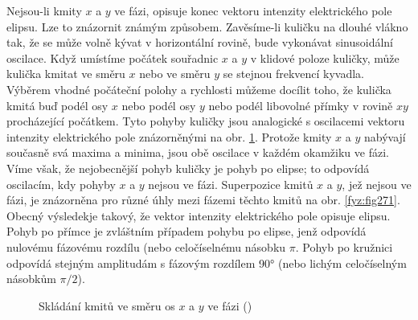     Nejsou-li kmity \(x\) a \(y\) ve fázi, opisuje konec vektoru intenzity elektrického pole elipsu.
    Lze to znázornit známým způsobem. Zavěsíme-li kuličku na dlouhé vlákno tak, že se může volně
    kývat v horizontální rovině, bude vykonávat sinusoidální oscilace. Když umístíme počátek
    souřadnic \(x\) a \(y\) v klidové poloze kuličky, může kulička kmitat ve směru \(x\) nebo ve
    směru \(y\) se stejnou frekvencí kyvadla. Výběrem vhodné počáteční polohy a rychlosti můžeme
    docílit toho, že kulička kmitá buď podél osy \(x\) nebo podél osy \(y\) nebo podél libovolné
    přímky v rovině \(xy\) procházející počátkem. Tyto pohyby kuličky jsou analogické s oscilacemi
    vektoru intenzity elektrického pole znázorněnými na obr. \ref{fyz:fig270}. Protože kmity \(x\) a
    \(y\) nabývají současně svá maxima a minima, jsou obě oscilace v každém okamžiku ve fázi. Víme
    však, že nejobecnější pohyb kuličky je pohyb po elipse; to odpovídá oscilacím, kdy pohyby \(x\)
    a \(y\) nejsou ve fázi. Superpozice kmitů \(x\) a \(y\), jež nejsou ve fázi, je znázorněna pro
    různé úhly mezi fázemi těchto kmitů na obr. \ref{fyz:fig271}. Obecný výsledekje takový, že
    vektor intenzity elektrického pole opisuje elipsu. Pohyb po přímce je zvláštním případem pohybu
    po elipse, jenž odpovídá nulovému fázovému rozdílu (nebo celočíselnému násobku \(\pi\). Pohyb po
    kružnici odpovídá stejným amplitudám s fázovým rozdílem \ang{90} (nebo lichým celočíselným
    násobkům \(\pi/2\)).

    \begin{figure}[ht!]  %
      \centering
        {}               
        {}                                                 \newline
        {}                         
        {}                                                 \newline         
        {}                         
        {}
      \caption{Skládání kmitů ve směru os \(x\) a \(y\) ve fázi (\cite[s.~437]{Feynman01})}
      \label{fyz:fig270}
    \end{figure}

